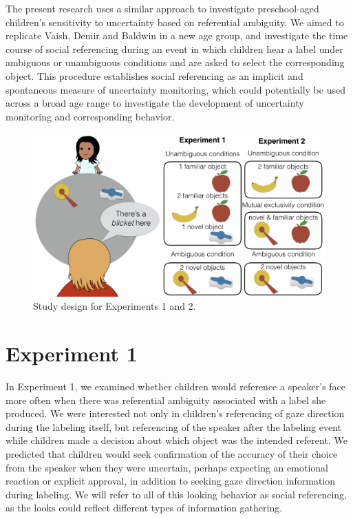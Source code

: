 \documentclass[10pt, letterpaper]{article}
\newenvironment{CodeChunk}{}{}
\begin{document}
The present research uses a similar approach to investigate
preschool-aged children's sensitivity to uncertainty based on
referential ambiguity. We aimed to replicate Vaish, Demir and Baldwin in
a new age group, and investigate the time course of social referencing
during an event in which children hear a label under ambiguous or
unambiguous conditions and are asked to select the corresponding object.
This procedure establishes social referencing as an implicit and
spontaneous measure of uncertainty monitoring, which could potentially
be used across a broad age range to investigate the development of
uncertainty monitoring and corresponding behavior.

\begin{CodeChunk}
\captionsetup{width=0.8\textwidth}\begin{figure}[h]

{\centering \includegraphics{figs/design-1} 

}

\caption[Study design for Experiments 1 and 2]{Study design for Experiments 1 and 2.}\label{fig:design}
\end{figure}
\end{CodeChunk}

\section{Experiment 1}\label{experiment-1}

In Experiment 1, we examined whether children would reference a
speaker's face more often when there was referential ambiguity
associated with a label she produced. We were interested not only in
children's referencing of gaze direction during the labeling itself, but
referencing of the speaker after the labeling event while children made
a decision about which object was the intended referent. We predicted
that children would seek confirmation of the accuracy of their choice
from the speaker when they were uncertain, perhaps expecting an
emotional reaction or explicit approval, in addition to seeking gaze
direction information during labeling. We will refer to all of this
looking behavior as social referencing, as the looks could reflect
different types of information gathering.
\end{document}
